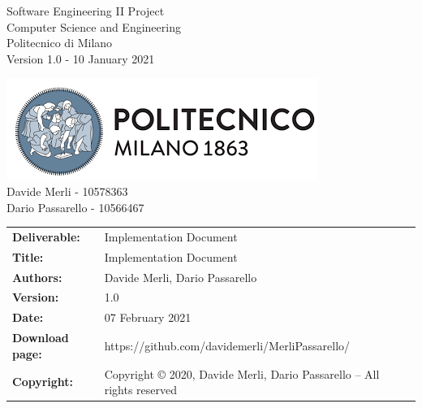 \begin{titlepage}
\begin{center}
    \begin{multicols}{2}
      \large
      \begin{flushleft}
        Software Engineering II Project \\
        Computer Science and Engineering\\
        Politecnico di Milano\\
        Version 1.0 - 10 January 2021 \\
      \end{flushleft}
      \begin{flushright}
        \includegraphics[scale=0.6]{Images/PolimiLogo.png} \\
        Davide Merli - 10578363\\
        Dario Passarello - 10566467 \\
      \end{flushright}
    \end{multicols}
  \end{center}

\end{titlepage}

\begin{table}[h!]
  \begin{tabu} to \textwidth { X[0.4,r,p] X[0.7,l,p] }
    \hline

    \textbf{Deliverable:}   & Implementation Document                                                \\
    \textbf{Title:}         & Implementation Document                                                \\
    \textbf{Authors:}       & Davide Merli, Dario Passarello                                         \\
    \textbf{Version:}       & 1.0                                                                    \\
    \textbf{Date:}          &    07 February 2021                                                    \\
    \textbf{Download page:} & https://github.com/davidemerli/MerliPassarello/                        \\
    \textbf{Copyright:}     & Copyright © 2020, Davide Merli, Dario Passarello – All rights reserved \\
    \hline
  \end{tabu}
\end{table}




